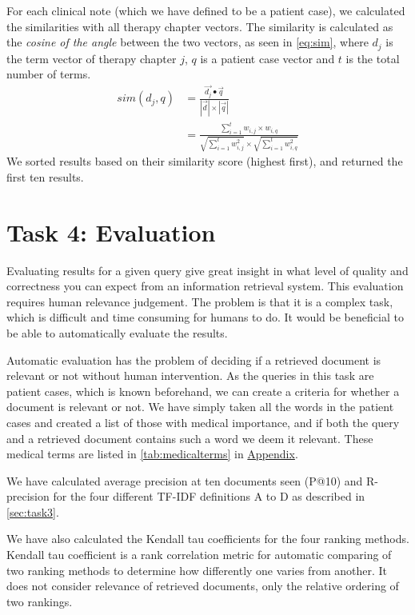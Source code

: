 For each clinical note (which we have defined to be a patient case), we
calculated the similarities with all therapy chapter vectors. The similarity is
calculated as the \emph{cosine of the angle} between the two vectors, as seen
in \autoref{eq:sim}, where \( d_{j} \) is the term vector of therapy chapter \( j \),
\( q \) is a patient case vector and \( t \) is the total number of terms.
\begin{align} \label{eq:sim}
	sim(d_{j}, q) &= \frac{\vec{d_{j}} \bullet \vec{q}}{|\vec{d}| \times |\vec{q}|} \nonumber \\
				  &= \frac{\sum_{i=1}^{t} w_{i,j} \times w_{i,q}}{\sqrt{\sum_{i=1}^{t} w_{i,j}^2} \times \sqrt{\sum_{i=1}^{t} w_{i,q}^2}}
\end{align}
We sorted results based on their similarity score (highest first), and
returned the first ten results.


\section{Task 4: Evaluation}
\label{sec:task4}
Evaluating results for a given query give great insight in what level of quality
and correctness you can expect from an information retrieval system. This evaluation requires human relevance judgement. 
The problem is that it is a complex task, 
which is difficult and time consuming for humans to
do. It would be beneficial to be able to automatically evaluate the results.

Automatic evaluation has the problem of deciding if a retrieved document
is relevant or not without human intervention. As the queries in this task are patient cases, which is
known beforehand, we can create a criteria for whether a document is relevant
or not. We have simply taken all the words in the patient cases and created a
list of those with medical importance, and if both the query and a retrieved
document contains such a word we deem it relevant. These medical terms are
listed in \autoref{tab:medicalterms} in \hyperref[appendix]{Appendix}.

We have calculated average precision at ten documents seen (P@10) and
R-precision for the four different TF-IDF definitions A to D as described in
\autoref{sec:task3}.

We have also calculated the Kendall tau coefficients for the four ranking
methods. Kendall tau coefficient is a rank correlation metric for automatic
comparing of two ranking methods to determine how differently one varies from
another. It does not consider relevance of retrieved documents, only the
relative ordering of two rankings.


